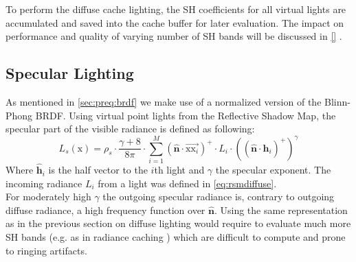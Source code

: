 \documentclass[thesis.tex]{subfiles}
\begin{document}
To perform the diffuse cache lighting, the SH coefficients for all virtual lights are accumulated and saved into the cache buffer for later evaluation.
The impact on performance and quality of varying number of SH bands will be discussed in \autoref{} .

\subsection{Specular Lighting} \label{sec:impl:specenvmap}
As mentioned in \autoref{sec:preq:brdf} we make use of a normalized version of the Blinn-Phong BRDF.
Using virtual point lights from the Reflective Shadow Map, the specular part of the visible radiance is defined as following:
\begin{equation}
L_s (\mathrm{x}) = \rho_s \cdot \frac{\gamma + 8}{8\pi} \cdot \sum\limits_{i=1}^{M}
(\hat{\mathbf{n}}\cdot \overrightarrow{\mathrm{x}\mathrm{x}_i})^+ \cdot L_i \cdot ((\hat{\mathbf{n}} \cdot \hat{\mathbf{h}}_i)^+)^\gamma
\end{equation}
Where $\hat{\mathbf{h}}_i$ is the half vector to the $i$th light and $\gamma$ the specular exponent.
The incoming radiance $L_i$ from a light was defined in \autoref{eq:rsmdiffuse}.
\\
For moderately high $\gamma$ the outgoing specular radiance is, contrary to outgoing diffuse radiance, a high frequency function over $\hat{\mathbf{n}}$.
Using the same representation as in the previous section on diffuse lighting would require to evaluate much more SH bands (e.g. as in radiance caching \cite{bib:radiancecaching}) which are difficult to compute and prone to ringing artifacts.
\end{document}
